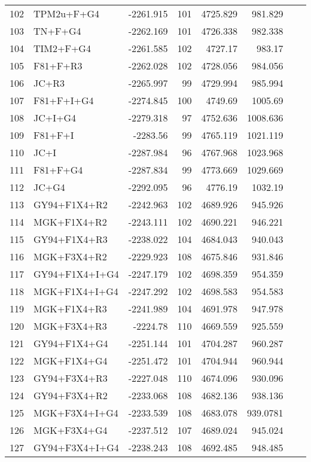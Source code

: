 \begin{longtable}{clrrrrrr}
	102 & TPM2u+F+G4 & -2261.915 & 101 & 4725.829 & 981.829 \\ 
	103 & TN+F+G4 & -2262.169 & 101 & 4726.338 & 982.338 \\ 
	104 & TIM2+F+G4 & -2261.585 & 102 & 4727.17 & 983.17 \\ 
	105 & F81+F+R3 & -2262.028 & 102 & 4728.056 & 984.056 \\ 
	106 & JC+R3 & -2265.997 & 99 & 4729.994 & 985.994 \\ 
	107 & F81+F+I+G4 & -2274.845 & 100 & 4749.69 & 1005.69 \\ 
	108 & JC+I+G4 & -2279.318 & 97 & 4752.636 & 1008.636 \\ 
	109 & F81+F+I & -2283.56 & 99 & 4765.119 & 1021.119 \\ 
	110 & JC+I & -2287.984 & 96 & 4767.968 & 1023.968 \\ 
	111 & F81+F+G4 & -2287.834 & 99 & 4773.669 & 1029.669 \\ 
	112 & JC+G4 & -2292.095 & 96 & 4776.19 & 1032.19 \\ 
	113 & GY94+F1X4+R2 & -2242.963 & 102 & 4689.926 & 945.926 \\ 
	114 & MGK+F1X4+R2 & -2243.111 & 102 & 4690.221 & 946.221 \\ 
	115 & GY94+F1X4+R3 & -2238.022 & 104 & 4684.043 & 940.043 \\ 
	116 & MGK+F3X4+R2 & -2229.923 & 108 & 4675.846 & 931.846 \\ 
	117 & GY94+F1X4+I+G4 & -2247.179 & 102 & 4698.359 & 954.359 \\ 
	118 & MGK+F1X4+I+G4 & -2247.292 & 102 & 4698.583 & 954.583 \\ 
	119 & MGK+F1X4+R3 & -2241.989 & 104 & 4691.978 & 947.978 \\ 
	120 & MGK+F3X4+R3 & -2224.78 & 110 & 4669.559 & 925.559 \\ 
	121 & GY94+F1X4+G4 & -2251.144 & 101 & 4704.287 & 960.287 \\ 
	122 & MGK+F1X4+G4 & -2251.472 & 101 & 4704.944 & 960.944 \\ 
	123 & GY94+F3X4+R3 & -2227.048 & 110 & 4674.096 & 930.096 \\ 
	124 & GY94+F3X4+R2 & -2233.068 & 108 & 4682.136 & 938.136 \\ 
	125 & MGK+F3X4+I+G4 & -2233.539 & 108 & 4683.078 & 939.0781 \\ 
	126 & MGK+F3X4+G4 & -2237.512 & 107 & 4689.024 & 945.024 \\ 
	127 & GY94+F3X4+I+G4 & -2238.243 & 108 & 4692.485 & 948.485 \\ 

\end{longtable}
